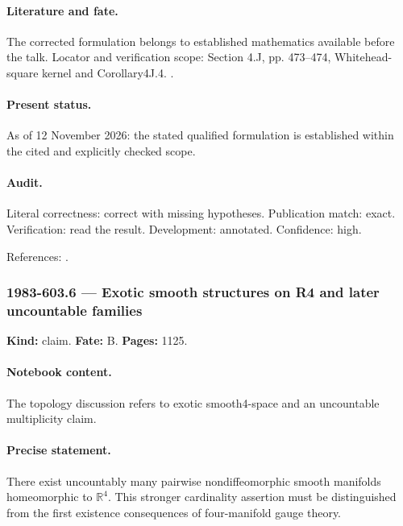 \paragraph{Literature and fate.} The corrected formulation belongs to established mathematics available before the talk. Locator and verification scope: Section 4.J, pp. 473--474, Whitehead-square kernel and Corollary4J.4. \cite{hatcher2002algebraic}.

\paragraph{Present status.} As of 12 November 2026: the stated qualified formulation is established within the cited and explicitly checked scope.

\paragraph{Audit.} Literal correctness: correct with missing hypotheses. Publication match: exact. Verification: read the result. Development: annotated. Confidence: high.

\noindent References: \citep{hatcher2002algebraic}.\par

\subsubsection{1983-603.6 --- Exotic smooth structures on R4 and later uncountable families}

\label{item:1983-603.6}

\noindent\textbf{Kind:} claim. \textbf{Fate:} B. \textbf{Pages:} 1125.\par

\paragraph{Notebook content.} The topology discussion refers to exotic smooth4-space and an uncountable multiplicity claim.

\paragraph{Precise statement.} There exist uncountably many pairwise nondiffeomorphic smooth manifolds homeomorphic to \(\mathbb R^4\). This stronger cardinality assertion must be distinguished from the first existence consequences of four-manifold gauge theory.

